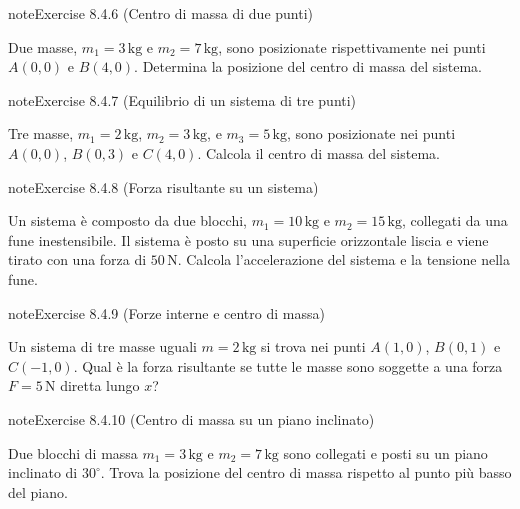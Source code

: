 \documentclass[letterpaper,10pt,italian]{jupyterBook}
\begin{document}
\begin{sphinxadmonition}{note}{Exercise 8.4.6 (Centro di massa di due punti)}



\sphinxAtStartPar
Due masse, \(m_1 = 3 \, \text{kg}\) e \(m_2 = 7 \, \text{kg}\), sono posizionate rispettivamente nei punti \(A(0, 0)\) e \(B(4, 0)\). Determina la posizione del centro di massa del sistema.
\end{sphinxadmonition}
 \label{exercise:ch/mechanics/statics-problems-exercise-6}

\begin{sphinxadmonition}{note}{Exercise 8.4.7 (Equilibrio di un sistema di tre punti)}



\sphinxAtStartPar
Tre masse, \(m_1 = 2 \, \text{kg}\), \(m_2 = 3 \, \text{kg}\), e \(m_3 = 5 \, \text{kg}\), sono posizionate nei punti \(A(0, 0)\), \(B(0, 3)\) e \(C(4, 0)\). Calcola il centro di massa del sistema.
\end{sphinxadmonition}
 \label{exercise:ch/mechanics/statics-problems-exercise-7}

\begin{sphinxadmonition}{note}{Exercise 8.4.8 (Forza risultante su un sistema)}



\sphinxAtStartPar
Un sistema è composto da due blocchi, \(m_1 = 10 \, \text{kg}\) e \(m_2 = 15 \, \text{kg}\), collegati da una fune inestensibile. Il sistema è posto su una superficie orizzontale liscia e viene tirato con una forza di \(50 \, \text{N}\). Calcola l’accelerazione del sistema e la tensione nella fune.
\end{sphinxadmonition}
 \label{exercise:ch/mechanics/statics-problems-exercise-8}

\begin{sphinxadmonition}{note}{Exercise 8.4.9 (Forze interne e centro di massa)}



\sphinxAtStartPar
Un sistema di tre masse uguali \(m = 2 \, \text{kg}\) si trova nei punti \(A(1, 0)\), \(B(0, 1)\) e \(C(-1, 0)\). Qual è la forza risultante se tutte le masse sono soggette a una forza \(F = 5 \, \text{N}\) diretta lungo \(x\)?
\end{sphinxadmonition}
 \label{exercise:ch/mechanics/statics-problems-exercise-9}

\begin{sphinxadmonition}{note}{Exercise 8.4.10 (Centro di massa su un piano inclinato)}



\sphinxAtStartPar
Due blocchi di massa \(m_1 = 3 \, \text{kg}\) e \(m_2 = 7 \, \text{kg}\) sono collegati e posti su un piano inclinato di \(30^\circ\). Trova la posizione del centro di massa rispetto al punto più basso del piano.
\end{sphinxadmonition}
\end{document}
